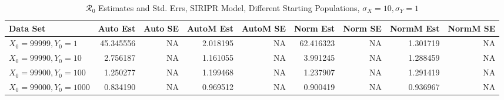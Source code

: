 \documentclass[12pt]{article}
\newcommand{\rr}{\ensuremath{\mathcal{R}_0}}
\begin{document}
\begin{table}[H]
	
	\caption{$\rr$ Estimates and Std. Errs, SIRIPR Model,
		Different Starting Populations, 
		$\sigma_X = 10, \sigma_Y = 1$}
	\begin{footnotesize}
		\hskip -1.7cm
		\begin{tabular}{l|r|r|r|r|r|r|r|r}
			\hline
			Data Set & Auto Est & Auto SE & AutoM Est & AutoM SE & Norm Est & Norm SE & NormM Est & NormM SE\\
			\hline
			$X_0 = 99999, Y_0 = 1$ & 45.345556 & NA & 2.018195 & NA & 62.416323 & NA & 1.301719 & NA\\
			\hline
			$X_0 = 99990, Y_0 = 10$ & 2.756187 & NA & 1.161055 & NA & 3.991245 & NA & 1.288459 & NA\\
			\hline
			$X_0 = 99900, Y_0 = 100$ & 1.250277 & NA & 1.199468 & NA & 1.237907 & NA & 1.291419 & NA\\
			\hline
			$X_0 = 99000, Y_0 = 1000$ & 0.834190 & NA & 0.969512 & NA & 0.900419 & NA & 0.936967 & NA\\
			\hline
		\end{tabular}
	\end{footnotesize}
\end{table}
\end{document}
